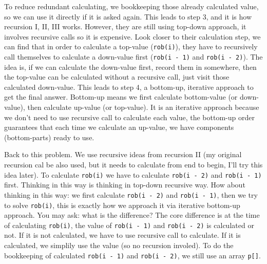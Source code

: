 \documentclass[11pt]{article}
\begin{document}
To reduce redundant calculating, we bookkeeping those already calculated value, so we can use it directly if it is asked again. This leads to step 3, and it is how recursion I, II, III works. However, they are still using top-down approach, it involves recursive calls so it is expensive. Look closer to their calculation step, we can find that in order to calculate a top-value (\texttt{rob(i)}), they have to recursively call themselves to calculate a down-value first (\texttt{rob(i - 1)} and \texttt{rob(i - 2)}). The idea is, if we can calculate the down-value first, record them in somewhere, then the top-value can be calculated without a recursive call, just visit those calculated down-value. This leads to step 4, a bottom-up, iterative approach to get the final answer. Bottom-up means we first calculate bottom-value (or down-value), then calculate up-value (or top-value). It is an iterative approach because we don't need to use recursive call to calculate each value, the bottom-up order guarantees that each time we calculate an up-value, we have components (bottom-parts) ready to use.

Back to this problem. We use recursive ideas from recursion II (my original recursion cal be also used, but it needs to calculate from end to begin, I'll try this idea later). To calculate \texttt{rob(i)} we have to calculate \texttt{rob(i - 2)} and \texttt{rob(i - 1)} first. Thinking in this way is thinking in top-down recursive way. How about thinking in this way: we first calculate \texttt{rob(i - 2)} and \texttt{rob(i - 1)}, then we try to solve \texttt{rob(i)}, this is exactly how we approach it via iterative bottom-up approach. You may ask: what is the difference? The core difference is at the time of calculating \texttt{rob(i)}, the value of \texttt{rob(i - 1)} and \texttt{rob(i - 2)} is calculated or not. If it is not calculated, we have to use recursive call to calculate. If it is calculated, we simplily use the value (so no recursion involed). To do the bookkeeping of calculated \texttt{rob(i - 1)} and \texttt{rob(i - 2)}, we still use an array \texttt{p[]}.
\end{document}
